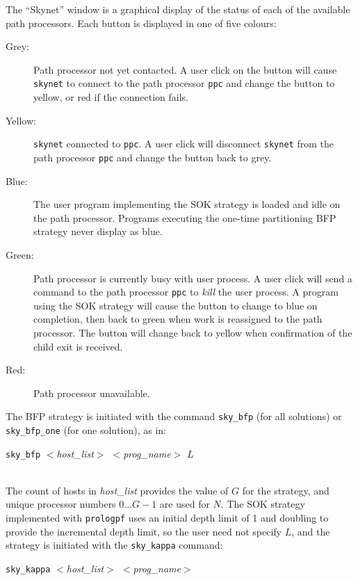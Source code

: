 The ``Skynet'' window is a graphical display of the status of each of the
available path processors.  Each button is displayed in one of five colours:
\begin{description}
\item[Grey: ]{Path processor not yet contacted.  A user click on the button will
    cause \texttt{skynet} to connect to the path processor \texttt{ppc} and change
    the button to yellow, or red if the connection fails.}
\item[Yellow: ]{\texttt{skynet} connected to \texttt{ppc}.  A user click will
    disconnect \texttt{skynet} from the path processor \texttt{ppc} and change the
    button back to grey.}
\item[Blue: ]{The user program implementing the SOK strategy is loaded and idle on
    the path processor.  Programs executing the one-time partitioning BFP
    strategy never display as blue.}
\item[Green: ]{Path processor is currently busy with user process.  A user click
    will send a command to the path processor \texttt{ppc} to
    \textit{kill} the user process.  A program using the SOK strategy will cause the
    button to change to blue on completion, then back to green when work is reassigned
    to the path processor.
    The button will change back to yellow when
    confirmation of the child exit is received.}
\item[Red: ]{Path processor unavailable.}
\end{description}

The BFP strategy is initiated with the command \texttt{sky\_{}bfp} (for all solutions)
or \texttt{sky\_{}bfp\_{}one} (for one solution), as in:\\
\centerline{\texttt{sky\_{}bfp} \textit{$<$host\_{}list$>$ $<$prog\_{}name$>$} $L$}\\
The count of hosts in \textit{host\_{}list} provides the value of $G$ for the strategy, and
unique processor numbers $0\ldots G-1$ are used for $N$.
The SOK strategy implemented with \texttt{prologpf} uses an initial depth limit of 1 and
doubling to provide the incremental depth limit, so the user need not specify $L$, and
the strategy is initiated with the \texttt{sky\_{}kappa} command:\\
\centerline{\texttt{sky\_{}kappa} \textit{$<$host\_{}list$>$ $<$prog\_{}name$>$}}


